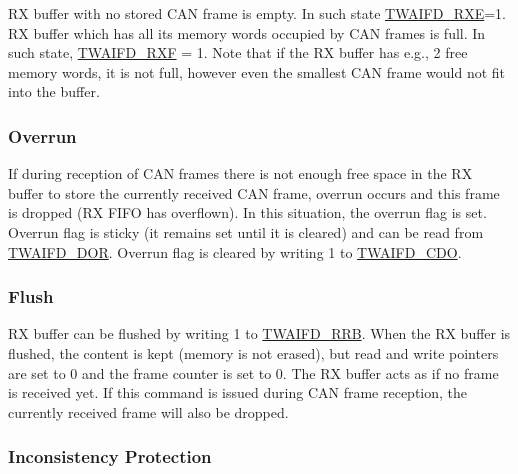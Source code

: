 \documentclass[main\_\_EN.tex]{subfiles}
\begin{document}
RX buffer with no stored CAN frame is empty. In such state \hyperref[fielddesc:TWAIFDRXE]{TWAIFD\_RXE}=1. RX buffer which has all its memory words occupied by CAN frames is full. In such state, \hyperref[fielddesc:TWAIFDRXF]{TWAIFD\_RXF} = 1. Note that if the RX buffer has e.g., 2 free memory words, it is not full, however even the smallest CAN frame would not fit into the buffer.

\subsubsection{Overrun}

If during reception of CAN frames there is not enough free space in the RX buffer to store the currently received CAN frame, overrun occurs and this frame is dropped (RX FIFO has overflown). In this situation, the overrun flag is set. Overrun flag is sticky (it remains set until it is cleared) and can be read from \hyperref[fielddesc:TWAIFDDOR]{TWAIFD\_DOR}. Overrun flag is cleared by writing 1 to \hyperref[fielddesc:TWAIFDCDO]{TWAIFD\_CDO}.

\subsubsection{Flush}
\label{sec:twai-func-flush}

RX buffer can be flushed by writing 1 to \hyperref[fielddesc:TWAIFDRRB]{TWAIFD\_RRB}. When the RX buffer is flushed, the content is kept (memory is not erased), but read and write pointers are set to 0 and the frame counter is set to 0. The RX buffer acts as if no frame is received yet. If this command is issued during CAN frame reception, the currently received frame will also be dropped.

\subsubsection{Inconsistency Protection}
\end{document}
